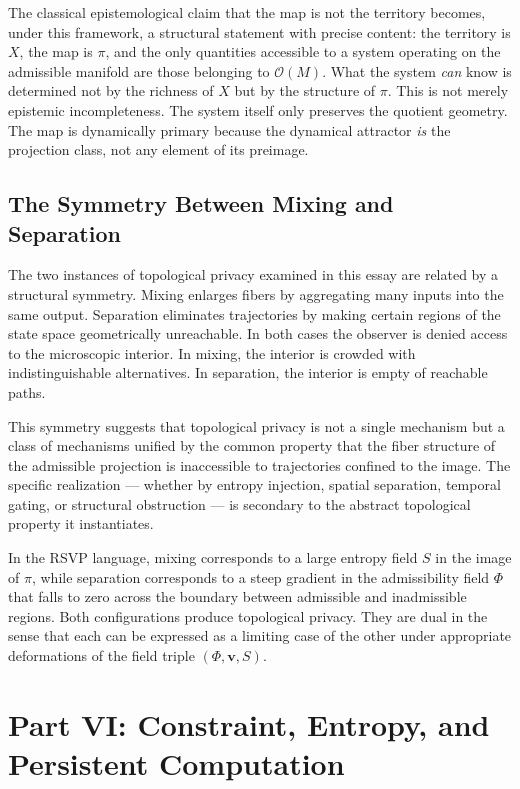 \documentclass[12pt, a4paper]{article}
\theoremstyle{essaystyle}
\begin{document}
The classical epistemological claim that the map is not the territory becomes, under
this framework, a structural statement with precise content: the territory is $X$, the
map is $\pi$, and the only quantities accessible to a system operating on the admissible
manifold are those belonging to $\mathcal{O}(M)$. What the system \emph{can} know is
determined not by the richness of $X$ but by the structure of $\pi$. This is not
merely epistemic incompleteness. The system itself only preserves the quotient geometry.
The map is dynamically primary because the dynamical attractor \emph{is} the projection
class, not any element of its preimage.

\subsection{The Symmetry Between Mixing and Separation}

The two instances of topological privacy examined in this essay are related by a
structural symmetry. Mixing enlarges fibers by aggregating many inputs into the same
output. Separation eliminates trajectories by making certain regions of the state space
geometrically unreachable. In both cases the observer is denied access to the
microscopic interior. In mixing, the interior is crowded with indistinguishable
alternatives. In separation, the interior is empty of reachable paths.

This symmetry suggests that topological privacy is not a single mechanism but a class
of mechanisms unified by the common property that the fiber structure of the admissible
projection is inaccessible to trajectories confined to the image. The specific
realization --- whether by entropy injection, spatial separation, temporal gating, or
structural obstruction --- is secondary to the abstract topological property it
instantiates.

In the RSVP language, mixing corresponds to a large entropy field $S$ in the image of
$\pi$, while separation corresponds to a steep gradient in the admissibility field
$\Phi$ that falls to zero across the boundary between admissible and inadmissible
regions. Both configurations produce topological privacy. They are dual in the sense
that each can be expressed as a limiting case of the other under appropriate
deformations of the field triple $(\Phi, \mathbf{v}, S)$.

\section{Part VI: Constraint, Entropy, and Persistent Computation}
\end{document}
